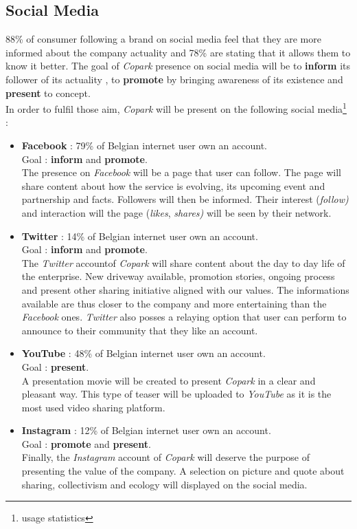 \documentclass[12pt,a4paper,oneside]{book}
\newcommand{\bp}{\textit{Copark }}
\begin{document}
\subsection{Social Media}
88\% of consumer following a brand on social media feel that they are more informed about the company actuality and  78\% are stating that it allows them to know it better.\cite{sminfo} The goal of \bp presence on social media will be to \textbf{inform} its follower of its actuality , to \textbf{promote} by bringing awareness of its existence and \textbf{present} to concept.\\
In order to fulfil those aim, \bp will be present on the following social media\footnote{usage statistics\cite{smusage}} :

\begin{itemize}
\item \textbf{Facebook} : 79\% of Belgian internet user own an account.\\Goal : \textbf{inform} and \textbf{promote}.\\
The presence on \textit{Facebook} will be a page that user can follow. The page will share content about how the service is evolving, its upcoming event and partnership and facts. Followers will then be informed. Their interest (\textit{follow)} and interaction will the page (\textit{likes}, \textit{shares)} will be seen by their network. 
\item \textbf{Twitter} : 14\% of Belgian internet user own an account.\\Goal : \textbf{inform} and \textbf{promote}.\\
The \textit{Twitter} accountof \bp will share content about the day to day life of the enterprise. New driveway available, promotion stories, ongoing process and present other sharing initiative aligned with our values. The informations available are thus closer to the company and more entertaining than the \textit{Facebook} ones. \textit{Twitter} also posses a relaying option that user can perform to announce to their community that they like an account.
\item \textbf{YouTube} : 48\% of Belgian internet user own an account.\\Goal : \textbf{present}.\\
A presentation movie will be created to present \bp in a clear and pleasant way. This type of teaser will be uploaded to \textit{YouTube} as it is the most used video sharing platform.
\item \textbf{Instagram} : 12\% of Belgian internet user own an account.\\Goal : \textbf{promote} and \textbf{present}.\\
Finally, the \textit{Instagram} account of \bp will deserve the purpose of presenting the value of the company. A selection on picture and quote about sharing, collectivism and ecology will displayed on the social media.
\end{itemize}
\end{document}
